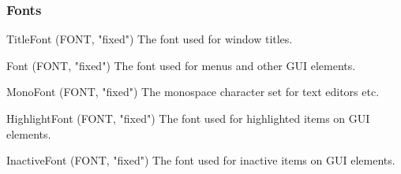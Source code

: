 \documentclass[10pt,a4paper]{article}
\newenvironment{ttdesc}[1]{
   \begin{list}{}{
          \renewcommand{\makelabel}[1]{\texttt{##1\hfill}}}}{\end{list}}
\begin{document}
\subsubsection{Fonts}
\begin{ttdesc}{description}
\item[TitleFont (FONT, "fixed")] The font used for window titles.
\item[Font (FONT, "fixed")] The font used for menus and other GUI elements.
\item[MonoFont (FONT, "fixed")] The monospace character set for text editors
etc.
\item[HighlightFont (FONT, "fixed")] The font used for highlighted items on
GUI elements.
\item[InactiveFont (FONT, "fixed")] The font used for inactive items on GUI
elements.
\end{ttdesc}
\end{document}
